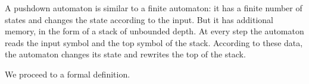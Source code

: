 

\setcounter{section}{6}
\setcounter{subsection}{1}
\setcounter{dfn}{0}

A pushdown automaton is similar to a finite automaton:
it has a finite number of states and changes the state according to the input.
But it has additional memory, in the form of a stack of unbounded depth.
At every step the automaton reads the input symbol and the top symbol of the stack.
According to these data, the automaton changes its state and rewrites the top of the stack.

We proceed to a formal definition.


